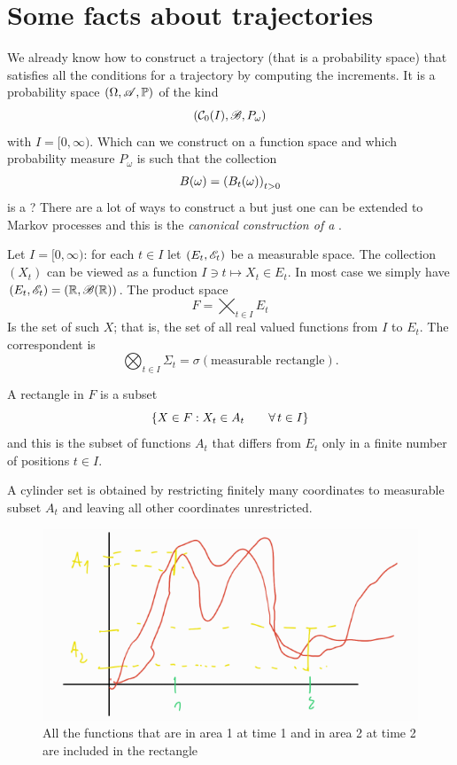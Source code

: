\documentclass[12pt]{report}
\begin{document}
\section{Some facts about \bwm{} trajectories}
We already know how to construct a trajectory (that is a probability space) that satisfies all the conditions for a \bwm{} trajectory by computing the increments. It is a probability space $(\Omega,\mathscr{A},\mathbb{P})$ of the kind
\begin{equation*}
	\left(\mathcal{C}_{0}(I),\mathscr{B},P_{\omega}\right)
\end{equation*}
with $I=[0,\infty)$. Which \sa{} can we construct on a function space and which probability measure $P_{\omega}$ is such that the collection
\begin{equation*}
	B(\omega)={\left(B_{t}(\omega)\right)}_{t>0}
\end{equation*}
is a \bwm? There are a lot of ways to construct a \bwm{} but just one can be extended to Markov processes and this is the \emph{canonical construction of a \bwm}. \par
Let $I=[0,\infty)$: for each $t\in I$ let $(E_{t},\mathscr{E}_{t})$ be a measurable space. The collection ${\left(X_{t}\right)}$ can be viewed as a function $I\ni t\mapsto X_{t}\in E_{t}$. In most case we simply have $(E_{t},\mathscr{E}_{t})=(\mathbb{R},\mathscr{B}(\mathbb{R}))$. The product space 
\begin{equation*}
	F=\bigtimes_{t\in I}E_{t}
\end{equation*}
Is the set of such $X$; that is, the set of all real valued functions from $I$ to $E_{t}$. The correspondent \sa{} is 
\begin{equation*}
	\bigotimes_{t\in I}\Sigma_{t}=\sigma(\text{measurable rectangle}).
\end{equation*}
\begin{definition}
	A rectangle in $F$ is a subset
	\begin{equation*}
		\left\{X\in F:X_{t}\in A_{t}\qquad\forall\, t\in I\right\}
	\end{equation*}
	and this is the subset of functions $A_{t}$ that differs from $E_{t}$ only in a finite number of positions $t\in I$.
\end{definition}
A cylinder set is obtained by restricting finitely many coordinates to measurable subset $A_{t}$
and leaving all other coordinates unrestricted.
\begin{figure}[h]
	\centering
	\includegraphics[width=0.7\linewidth]{img/screenshot001}
	\caption{All the functions that are in area 1 at time 1 and in area 2 at time 2 are included in the rectangle}
	\label{fig:screenshot001}
\end{figure}
\end{document}

